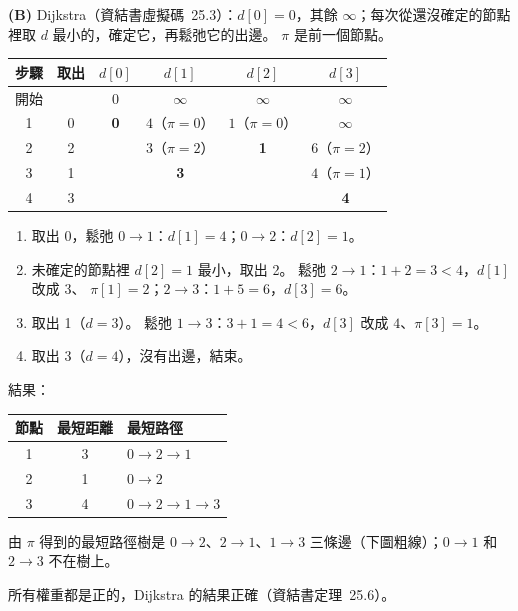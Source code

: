 \begin{pastsoln}
\textbf{(B)} Dijkstra（資結書虛擬碼~25.3）：$d[0] = 0$，其餘 $\infty$；每次從還沒確定的節點裡取 $d$
最小的，確定它，再鬆弛它的出邊。 $\pi$ 是前一個節點。
\begin{center}
\small
\begin{tabular}{cccccc}
\toprule
步驟 & 取出 & $d[0]$ & $d[1]$ & $d[2]$ & $d[3]$ \\
\midrule
開始 & & $0$ & $\infty$ & $\infty$ & $\infty$ \\
1 & 0 & \textbf{0} & $4$（$\pi = 0$） & $1$（$\pi = 0$） & $\infty$ \\
2 & 2 & & $3$（$\pi = 2$） & \textbf{1} & $6$（$\pi = 2$） \\
3 & 1 & & \textbf{3} & & $4$（$\pi = 1$） \\
4 & 3 & & & & \textbf{4} \\
\bottomrule
\end{tabular}
\end{center}
\begin{enumerate}
\item 取出 0，鬆弛 $0 \to 1$：$d[1] = 4$；$0 \to 2$：$d[2] = 1$。
\item 未確定的節點裡 $d[2] = 1$ 最小，取出 2。 鬆弛 $2 \to 1$：$1 + 2 = 3 < 4$，$d[1]$ 改成 $3$、
$\pi[1] = 2$；$2 \to 3$：$1 + 5 = 6$，$d[3] = 6$。
\item 取出 1（$d = 3$）。 鬆弛 $1 \to 3$：$3 + 1 = 4 < 6$，$d[3]$ 改成 $4$、$\pi[3] = 1$。
\item 取出 3（$d = 4$），沒有出邊，結束。
\end{enumerate}
結果：
\begin{center}
\begin{tabular}{ccl}
\toprule
節點 & 最短距離 & 最短路徑 \\
\midrule
1 & 3 & $0 \to 2 \to 1$ \\
2 & 1 & $0 \to 2$ \\
3 & 4 & $0 \to 2 \to 1 \to 3$ \\
\bottomrule
\end{tabular}
\end{center}
由 $\pi$ 得到的最短路徑樹是 $0 \to 2$、$2 \to 1$、$1 \to 3$ 三條邊（下圖粗線）；$0 \to 1$ 和 $2 \to 3$
不在樹上。
\begin{center}
\end{center}
所有權重都是正的，Dijkstra 的結果正確（資結書定理~25.6）。
\end{pastsoln}

